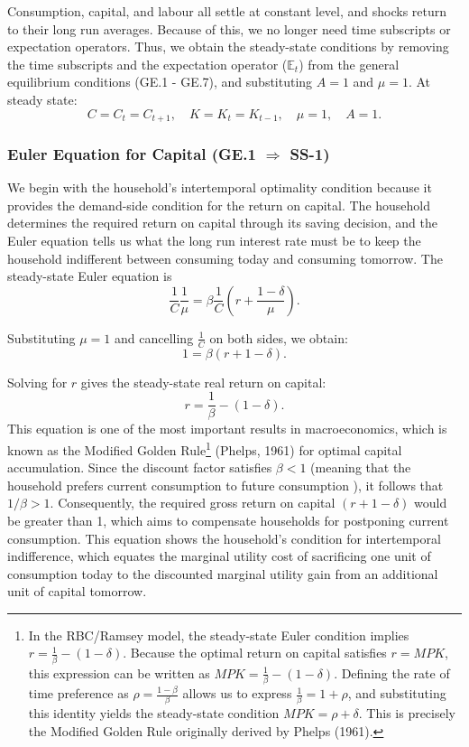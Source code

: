 \documentclass[12pt]{article}
\begin{document}
Consumption, capital, and labour all settle at constant level, and shocks return to their long run averages. Because of this, we no longer need time subscripts or expectation operators. Thus, we obtain the steady-state conditions by removing the time subscripts and the expectation operator ($\mathbb{E}_t$) from the general equilibrium conditions (GE.1 - GE.7), and substituting $A=1$ and $\mu=1$.
At steady state:
\[
C = C_{t} = C_{t+1}, \quad K = K_t = K_{t-1}, \quad \mu = 1, \quad A=1.
\]
\subsubsection{Euler Equation for Capital (GE.1 $\Longrightarrow$ SS-1)}
We begin with the household’s intertemporal optimality condition because it  provides the demand-side condition for the return on capital. The household determines the required return on capital through its saving decision, and the Euler equation tells us what the long run interest rate must be to keep the household indifferent between consuming today and consuming tomorrow.
The steady-state Euler equation is
\[
\frac{1}{C}\frac{1}{\mu}
= 
\beta \frac{1}{C}\left( r + \frac{1-\delta}{\mu} \right).
\]

Substituting $\mu = 1$ and cancelling $\frac{1}{C}$ on both sides, we obtain:
\[
1 = \beta \left( r + 1 - \delta \right).
\]

Solving for $r$ gives the steady-state real return on capital:
\[
r = \frac{1}{\beta} - (1 - \delta).
\tag{20}
\]
This equation is one of the most important results in macroeconomics, which is known as the Modified Golden Rule\footnote{%
In the RBC/Ramsey model, the steady-state Euler condition implies \( r = \frac{1}{\beta} - (1-\delta) \). Because the optimal return on capital satisfies \( r = MPK \), this expression can be written as \( MPK = \frac{1}{\beta} - (1-\delta) \). Defining the rate of time preference as \( \rho = \frac{1-\beta}{\beta} \) allows us to express \( \frac{1}{\beta} = 1 + \rho \), and substituting this identity yields the steady-state condition \( MPK = \rho + \delta \). This is precisely the Modified Golden Rule originally derived by Phelps (1961).%
} (Phelps, 1961) for optimal capital accumulation. Since the discount factor satisfies \(\beta <1\) (meaning that the household prefers current consumption to future consumption ), it follows that \(1/\beta >1\). Consequently, the required gross return on capital \((r + 1 - \delta)\) would be greater than 1, which aims to compensate households for postponing current consumption. 
This equation shows the household’s condition for intertemporal indifference, which equates the marginal utility cost of sacrificing one unit of consumption today to the discounted marginal utility gain from an additional unit of capital tomorrow.
\end{document}
